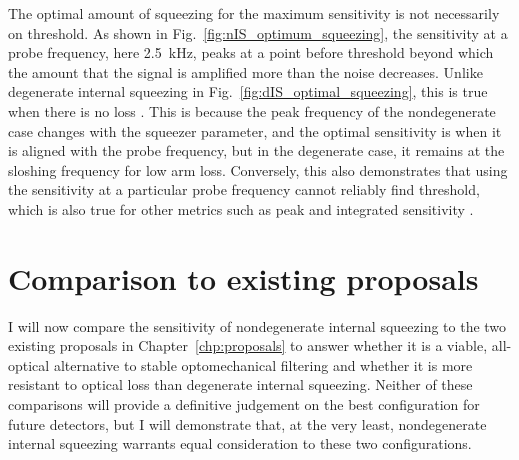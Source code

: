 
The optimal amount of squeezing for the maximum sensitivity is not necessarily on threshold. As shown in Fig.~\ref{fig:nIS_optimum_squeezing}, the sensitivity at a probe frequency, here 2.5~kHz, peaks at a point before threshold beyond which the amount that the signal is amplified more than the noise decreases. Unlike degenerate internal squeezing in Fig.~\ref{fig:dIS_optimal_squeezing}, this is true when there is no loss . This is because the peak frequency of the nondegenerate case changes with the squeezer parameter, and the optimal sensitivity is when it is aligned with the probe frequency, but in the degenerate case, it remains at the sloshing frequency for low arm loss. 
Conversely, this also demonstrates that using the sensitivity at a particular probe frequency cannot reliably find threshold, which is also true for other metrics such as peak and integrated sensitivity . %


\section{Comparison to existing proposals}

I will now compare the sensitivity of nondegenerate internal squeezing to the two existing proposals in Chapter~\ref{chp:proposals} to answer whether it is a viable, all-optical alternative to stable optomechanical filtering and whether it is more resistant to optical loss than degenerate internal squeezing. Neither of these comparisons will provide a definitive judgement on the best configuration for future detectors, but I will demonstrate that, at the very least, nondegenerate internal squeezing warrants equal consideration to these two configurations.

